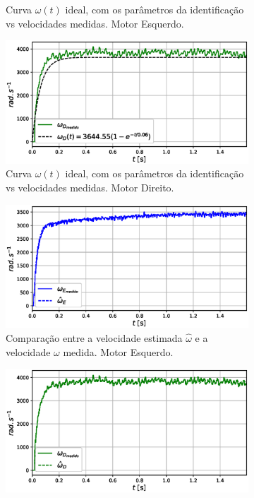 \begin{figure}[H]
\begin{subfigure}{.5\textwidth}
    \caption{Curva $\omega(t)$ ideal, com os parâmetros da identificação vs velocidades medidas. Motor Esquerdo.}
    \label{fig:exp04:regressao_medido_esquerdo}
    \end{subfigure}
    \hfill
    \begin{subfigure}{.5\textwidth}
    \centering
    \includegraphics[width=\textwidth]{figuras/resultados/exp04/regressao_vs_medido_direito100.eps}
    \caption{Curva $\omega(t)$ ideal, com os parâmetros da identificação vs velocidades medidas. Motor Direito.}
    \label{fig:exp04:regressao_medido_direito}
    \end{subfigure}
    \hfill
    \begin{subfigure}{.5\textwidth}
    \centering
    \includegraphics[width=\textwidth]{figuras/resultados/exp04/filtro_vs_sem_filtro_esquerdo100.eps}
    \caption{Comparação entre a velocidade estimada $\hat{\omega}$ e a velocidade $\omega$ medida. Motor Esquerdo.}
    \label{fig:exp04:filtragem_esquerdo}
    \end{subfigure}
    \hfill
    \begin{subfigure}{.5\textwidth}
    \centering
    \includegraphics[width=\textwidth]{figuras/resultados/exp04/filtro_vs_sem_filtro_direito100.eps}

\end{subfigure}
\end{figure}
